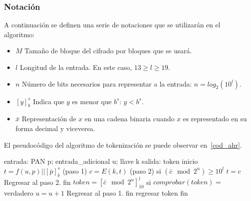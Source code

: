 \subsubsection{Notación}
A continuación se definen una serie de notaciones que se utilizarán en el
algoritmo:
\begin{itemize}
  \item $ M $ Tamaño de bloque del cifrado por bloques que se usará.
  \item $ l $ Longitud de la entrada. En este caso, $13 \geq l \geq 19$.
  \item $ n $ Número de bits necesarios para representar a la entrada:
    $n = log_2(10^l)$.
  \item $ [y]^s_b $ Indica que $y$ es menor que $b^s$: $y < b^s$.
  \item $\bar{x}$ Representación de $x$ en una cadena binaria cuando $x$ es
    representado en su forma decimal y viceversa.
\end{itemize}


El pseudocódigo del algoritmo de tokenización se puede observar en~\ref{cod_ahr}.
\begin{pseudocodigo}[%
    caption={Híbrido reversible, método de tokenización},
    label{cod_ahr}%
  ]
    entrada: PAN p; entrada_adicional u; llave k
    salida:  token
    inicio
      $t = f(u, p) || [\bar{p}]^s_b$ (paso 1)
      $c = E(k, t)$ (paso 2)
      si $(\bar{c} \mod 2^n) \geq 10^l$
        $t = c$
        Regresar al paso 2.
      fin
      $token = {[\bar{c} \mod 2^n]}^l_{10}$
      si $comprobar(token) =$ verdadero
        $u = u + 1$
        Regresar al paso 1.
      fin
      regresar token
    fin
\end{pseudocodigo}

